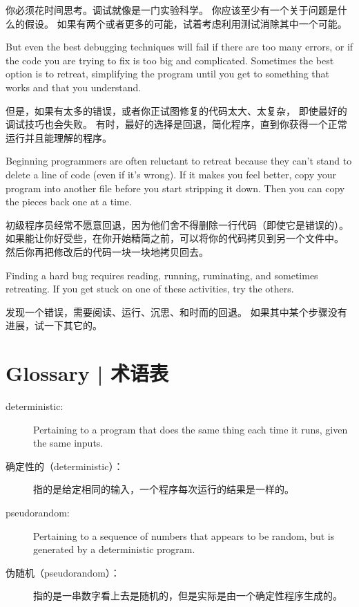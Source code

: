 {你必须花时间思考。调试就像是一门实验科学。
你应该至少有一个关于问题是什么的假设。
如果有两个或者更多的可能，试着考虑利用测试消除其中一个可能。

But even the best debugging techniques will fail if there are too many
errors, or if the code you are trying to fix is too big and
complicated.  Sometimes the best option is to retreat, simplifying the
program until you get to something that works and that you
understand.

但是，如果有太多的错误，或者你正试图修复的代码太大、太复杂，
即使最好的调试技巧也会失败。
有时，最好的选择是回退，简化程序，直到你获得一个正常运行并且能理解的程序。

Beginning programmers are often reluctant to retreat because
they can't stand to delete a line of code (even if it's wrong).
If it makes you feel better, copy your program into another file
before you start stripping it down.  Then you can copy the pieces
back one at a time.

初级程序员经常不愿意回退，因为他们舍不得删除一行代码（即使它是错误的）。
如果能让你好受些，在你开始精简之前，可以将你的代码拷贝到另一个文件中。
然后你再把修改后的代码一块一块地拷贝回去。

Finding a hard bug requires reading, running, ruminating, and
sometimes retreating.  If you get stuck on one of these activities,
try the others.

发现一个错误，需要阅读、运行、沉思、和时而的回退。
如果其中某个步骤没有进展，试一下其它的。

\section{Glossary  |  术语表}
\begin{description}
\item[deterministic:] Pertaining to a program that does the same
thing each time it runs, given the same inputs.

\item[确定性的（deterministic）：]指的是给定相同的输入，一个程序每次运行的结果是一样的。

\item[pseudorandom:] Pertaining to a sequence of numbers that appears
to be random, but is generated by a deterministic program.

\item[伪随机（pseudorandom）：]指的是一串数字看上去是随机的，但是实际是由一个确定性程序生成的。


\end{description}}

